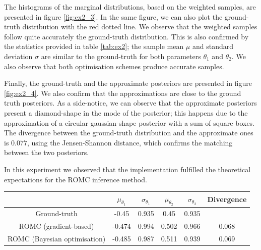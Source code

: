 The histograms of the marginal distributions, based on the weighted
samples, are presented in figure \ref{fig:ex2_3}. In the same figure,
we can also plot the ground-truth distribution with the red dotted
line. We observe that the weighted samples follow quite accurately the
ground-truth distribution. This is also confirmed by the statistics
provided in table \ref{tab:ex2}; the sample mean $\mu$ and standard
deviation $\sigma$ are similar to the ground-truth for both parameters
$\theta_1$ and $\theta_2$. We also observe that both optimisation
schemes produce accurate samples.

Finally, the ground-truth and the approximate posteriors are presented
in figure \ref{fig:ex2_4}. We also confirm that the approximations are
close to the ground truth posteriors. As a side-notice, we can observe
that the approximate posteriors present a diamond-shape in the mode of
the posterior; this happens due to the approximation of a circular
gaussian-shape posterior with a sum of square boxes. The divergence
between the ground-truth distribution and the approximate ones is
$0.077$, using the Jensen-Shannon distance, which confirms the
matching between the two posteriors.

In this experiment we observed that the implementation fulfilled the
theoretical expectations for the ROMC inference method.

\begin{center} \label{tab:ex2}
\begin{tabular}{ c|c|c|c|c|c }
\hline
& $\mu_{\theta_1}$ & $\sigma_{\theta_1}$ & $\mu_{\theta_2}$ & $\sigma_{\theta_2}$ & Divergence\\
\hline \hline
Ground-truth & -0.45 & 0.935 & 0.45 & 0.935 & \\
\hline
ROMC (gradient-based) & -0.474 & 0.994 & 0.502 & 0.966 & 0.068\\
\hline
ROMC (Bayesian optimisation) & -0.485 & 0.987 & 0.511 & 0.939 & 0.069\\
\hline
\end{tabular}
\end{center}


